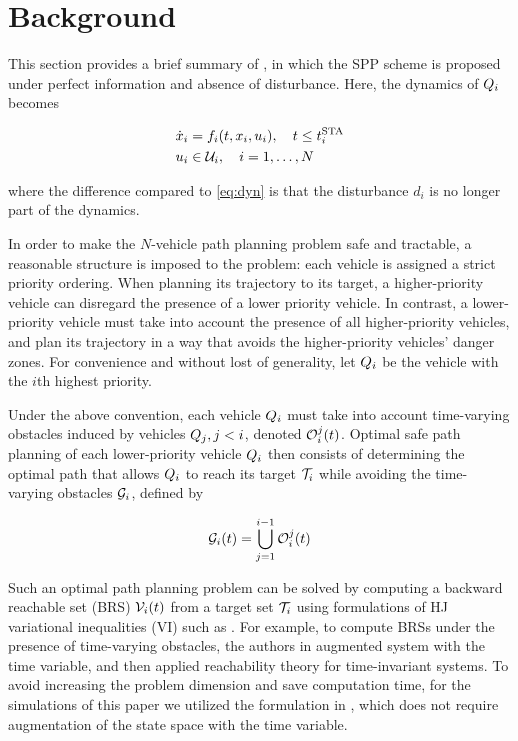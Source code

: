 \section{Background \label{sec:background}}
This section provides a brief summary of \cite{Chen15}, in which the SPP scheme is proposed under perfect information and absence of disturbance. Here, the dynamics of $Q_i$ becomes

\begin{equation}
\label{eq:dyn_no_dstb}
\begin{aligned}
\dot{x}_i &= f_i(t, x_i, u_i), \quad t \le t^\text{STA}_i \\
u_i &\in \mathcal{U}_i, \quad i = 1,\ldots, N
\end{aligned}
\end{equation}

\noindent where the difference compared to \eqref{eq:dyn} is that the disturbance $d_i$ is no longer part of the dynamics.

In order to make the $N$-vehicle path planning problem safe and tractable, a reasonable structure is imposed to the problem: each vehicle is assigned a strict priority ordering. When planning its trajectory to its target, a higher-priority vehicle can disregard the presence of a lower priority vehicle. In contrast, a lower-priority vehicle must take into account the presence of all higher-priority vehicles, and plan its trajectory in a way that avoids the higher-priority vehicles' danger zones. For convenience and without lost of generality, let $Q_i$ be the vehicle with the $i$th highest priority. 

Under the above convention, each vehicle $Q_i$ must take into account time-varying obstacles induced by vehicles $Q_j, j<i$, denoted $\mathcal{O}_i^j(t)$. Optimal safe path planning of each lower-priority vehicle $Q_i$ then consists of determining the optimal path that allows $Q_i$ to reach its target $\mathcal{T}_i$ while avoiding the time-varying obstacles $\mathcal{G}_i$, defined by

\begin{equation}
\label{eq:ioset}
\mathcal{G}_i(t) = \bigcup_{j=1}^{i-1}\mathcal{O}_i^j(t)
\end{equation}

Such an optimal path planning problem can be solved by computing a backward reachable set (BRS) $\mathcal{V}_i(t)$ from a target set $\mathcal{T}_i$ using formulations of HJ variational inequalities (VI) such as \cite{Barron90, Bokanowski10, Bokanowski11, Fisac15}. For example, to compute BRSs under the presence of time-varying obstacles, the authors in \cite{Bokanowski11} augmented system with the time variable, and then applied reachability theory for time-invariant systems. To avoid increasing the problem dimension and save computation time, for the simulations of this paper we utilized the formulation in \cite{Fisac15}, which does not require augmentation of the state space with the time variable.

